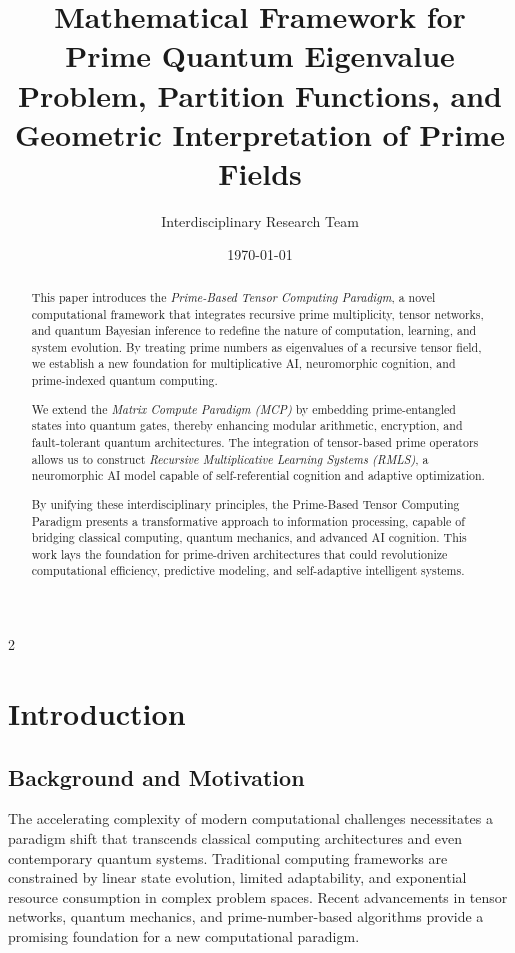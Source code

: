 \documentclass{article}
\title{Mathematical Framework for Prime Quantum Eigenvalue Problem, Partition Functions, and Geometric Interpretation of Prime Fields}
\author{Interdisciplinary Research Team}
\affil{Citizen Gardens - The Foundation of Multiplicity\\info@citizengardens.org}
\date{\today}
\theoremstyle{plain}
\theoremstyle{plain}
\theoremstyle{definition}
\theoremstyle{remark}
\begin{document}
\maketitle
\begin{abstract}
This paper introduces the \textit{Prime-Based Tensor Computing Paradigm}, a novel computational framework that integrates recursive prime multiplicity, tensor networks, and quantum Bayesian inference to redefine the nature of computation, learning, and system evolution. By treating prime numbers as eigenvalues of a recursive tensor field, we establish a new foundation for multiplicative AI, neuromorphic cognition, and prime-indexed quantum computing. 

We extend the \textit{Matrix Compute Paradigm (MCP)} by embedding prime-entangled states into quantum gates, thereby enhancing modular arithmetic, encryption, and fault-tolerant quantum architectures. The integration of tensor-based prime operators allows us to construct \textit{Recursive Multiplicative Learning Systems (RMLS)}, a neuromorphic AI model capable of self-referential cognition and adaptive optimization.

By unifying these interdisciplinary principles, the Prime-Based Tensor Computing Paradigm presents a transformative approach to information processing, capable of bridging classical computing, quantum mechanics, and advanced AI cognition. This work lays the foundation for prime-driven architectures that could revolutionize computational efficiency, predictive modeling, and self-adaptive intelligent systems.
\end{abstract}
\newpage
 \begin{multicols}{2}
\begin{singlespace}
\tableofcontents
\end{singlespace}
\end{multicols}
\section{Introduction}

\subsection{Background and Motivation}

The accelerating complexity of modern computational challenges necessitates a paradigm shift that transcends classical computing architectures and even contemporary quantum systems. Traditional computing frameworks are constrained by linear state evolution, limited adaptability, and exponential resource consumption in complex problem spaces. Recent advancements in tensor networks, quantum mechanics, and prime-number-based algorithms provide a promising foundation for a new computational paradigm.
\end{document}
